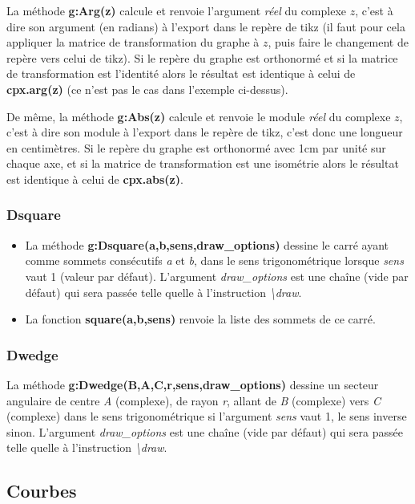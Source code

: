 La méthode \textbf{g:Arg(z)} calcule et renvoie l'argument \textit{réel} du complexe $z$, c'est à dire son argument (en radians) à l'export dans le repère de tikz (il faut pour cela appliquer la matrice de transformation du graphe à $z$, puis faire le changement de repère vers celui de tikz). Si le repère du graphe est orthonormé et si la matrice de transformation est l'identité alors le résultat est identique à celui de \textbf{cpx.arg(z)} (ce n'est pas le cas dans l'exemple ci-dessus).

De même, la méthode \textbf{g:Abs(z)} calcule et renvoie le module \textit{réel} du complexe $z$, c'est à dire son module à l'export dans le repère de tikz, c'est donc une longueur en centimètres. Si le repère du graphe est orthonormé avec 1cm par unité sur chaque axe, et si la matrice de transformation est une isométrie alors le résultat est identique à celui de \textbf{cpx.abs(z)}.


\subsubsection{Dsquare}
\begin{itemize}
    \item La méthode \textbf{g:Dsquare(a,b,sens,draw\_options)} dessine le carré ayant comme sommets consécutifs \emph{a} et \emph{b}, dans le sens trigonométrique lorsque \emph{sens} vaut 1 (valeur par défaut). L'argument \emph{draw\_options} est une chaîne (vide par défaut) qui sera passée telle quelle à l'instruction \emph{\textbackslash draw}.
  \item La fonction \textbf{square(a,b,sens)} renvoie la liste des sommets de ce carré.
\end{itemize}

\subsubsection{Dwedge}
La méthode \textbf{g:Dwedge(B,A,C,r,sens,draw\_options)} dessine un secteur angulaire de centre \emph{A} (complexe), de rayon \emph{r}, allant de \emph{B} (complexe) vers \emph{C} (complexe) dans le sens trigonométrique si l'argument \emph{sens} vaut 1, le sens inverse sinon. L'argument \emph{draw\_options} est une chaîne (vide par défaut) qui sera passée telle quelle à l'instruction \emph{\textbackslash draw}.


\subsection{Courbes}

